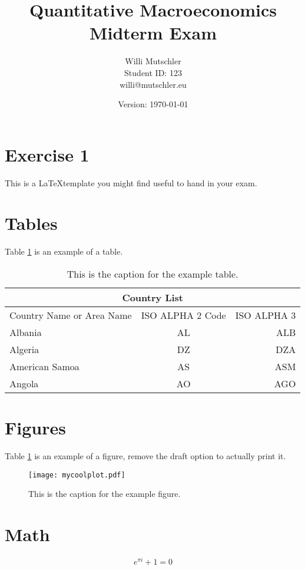 \documentclass[a4paper]{scrartcl}
\begin{document}
\title{Quantitative Macroeconomics\\Midterm Exam}
\author{Willi Mutschler\\Student ID: 123\\willi@mutschler.eu}
\date{Version: \today}
\maketitle\thispagestyle{empty}

\newpage
\tableofcontents\thispagestyle{empty}\newpage \setcounter{page}{1}

\section{Exercise 1}\label{sec:introduction}
This is a \LaTeX template you might find useful to hand in your exam.

\section{Tables}
Table \ref{tbl:1} is an example of a table.
\begin{table}[h!]
	\centering
	\begin{tabular}{|l|c|r|}
	\hline
	\multicolumn{3}{|c|}{Country List} \\
	\hline
	Country Name or Area Name& ISO ALPHA 2 Code &ISO ALPHA 3 \\ \hline
	Albania &AL & ALB \\
	Algeria &DZ & DZA \\
	American Samoa & AS & ASM \\
	Angola & AO & AGO \\
	\hline
	\end{tabular}
	\caption{This is the caption for the example table.} \label{tbl:1}
\end{table}

\section{Figures}
Table \ref{fig:1} is an example of a figure, remove the draft option to actually print it.
\begin{figure}[t!]\centering
	\texttt{[image: mycoolplot.pdf]}
	\caption{This is the caption for the example figure.}
	\label{fig:1}
\end{figure}

\section{Math}
\begin{equation}
e^{\pi i} + 1 = 0\label{eq:euler}
\end{equation}
\end{document}

